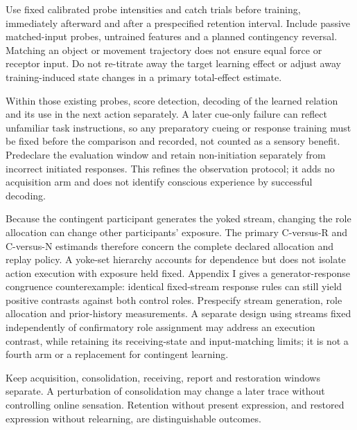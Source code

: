 \documentclass[
  american,
  11pt,
  letterpaper,
]{article}
\begin{document}
Use fixed calibrated probe intensities and catch trials before training, immediately afterward and after a prespecified retention interval. Include passive matched-input probes, untrained features and a planned contingency reversal. Matching an object or movement trajectory does not ensure equal force or receptor input. Do not re-titrate away the target learning effect or adjust away training-induced state changes in a primary total-effect estimate.

Within those existing probes, score detection, decoding of the learned relation and its use in the next action separately. A later cue-only failure can reflect unfamiliar task instructions, so any preparatory cueing or response training must be fixed before the comparison and recorded, not counted as a sensory benefit. Predeclare the evaluation window and retain non-initiation separately from incorrect initiated responses. This refines the observation protocol; it adds no acquisition arm and does not identify conscious experience by successful decoding.

Because the contingent participant generates the yoked stream, changing the role allocation can change other participants' exposure. The primary C-versus-R and C-versus-N estimands therefore concern the complete declared allocation and replay policy. A yoke-set hierarchy accounts for dependence but does not isolate action execution with exposure held fixed. Appendix I gives a generator-response congruence counterexample: identical fixed-stream response rules can still yield positive contrasts against both control roles. Prespecify stream generation, role allocation and prior-history measurements. A separate design using streams fixed independently of confirmatory role assignment may address an execution contrast, while retaining its receiving-state and input-matching limits; it is not a fourth arm or a replacement for contingent learning.

Keep acquisition, consolidation, receiving, report and restoration windows separate. A perturbation of consolidation may change a later trace without controlling online sensation. Retention without present expression, and restored expression without relearning, are distinguishable outcomes.
\end{document}
